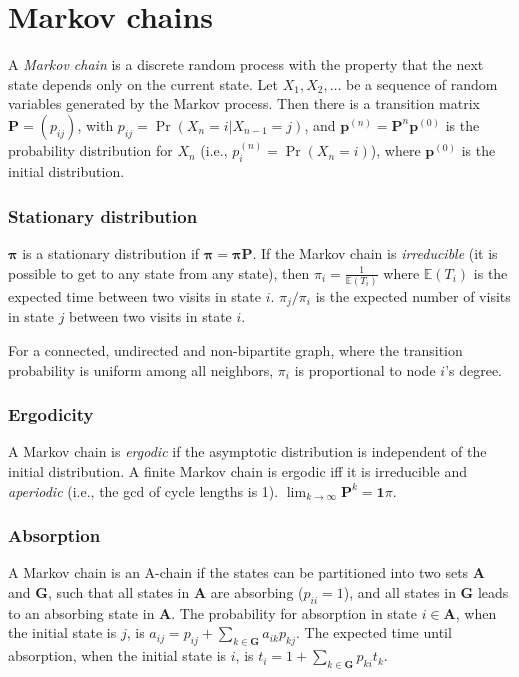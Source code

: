 \section{Markov chains}
A \emph{Markov chain} is a discrete random process with the property that the
next state depends only on the current state. Let $X_1,X_2,\ldots$ be a
sequence of random variables generated by the Markov process. Then there is a
transition matrix $\mathbf{P} = (p_{ij})$, with $p_{ij} = \Pr(X_n = i | X_{n-1}
     = j)$, and $\mathbf{p}^{(n)} = \mathbf P^n \mathbf p^{(0)}$ is the probability
distribution for $X_n$ (i.e., $p^{(n)}_i = \Pr(X_n = i)$), where
$\mathbf{p}^{(0)}$ is the initial distribution.

\subsubsection{Stationary distribution}
$\mathbf{\pi}$ is a stationary distribution if $\mathbf{\pi} = \mathbf{\pi P}$.
If the Markov chain is \emph{irreducible} (it is possible to get to any state from any state),
then $\pi_i = \frac{1}{\mathbb{E}(T_i)}$ where $\mathbb{E}(T_i)$  is the expected time between two visits in state $i$.
$\pi_j/\pi_i$ is the expected number of visits in state $j$ between two visits in state $i$.

For a connected, undirected and non-bipartite graph, where the transition
probability is uniform among all neighbors, $\pi_i$ is proportional to node
$i$'s degree.

\subsubsection{Ergodicity}
A Markov chain is \emph{ergodic} if the asymptotic distribution is independent
of the initial distribution. A finite Markov chain is ergodic iff it is
irreducible and \emph{aperiodic} (i.e., the gcd of cycle lengths is 1).
$\lim_{k\rightarrow\infty}\mathbf{P}^k = \mathbf{1}\pi$.

\subsubsection{Absorption}
A Markov chain is an A-chain if the states can be partitioned into two sets
$\mathbf{A}$ and $\mathbf{G}$, such that all states in $\mathbf{A}$ are
absorbing ($p_{ii}=1$), and all states in $\mathbf{G}$ leads to an absorbing
state in $\mathbf{A}$. The probability for absorption in state
$i\in\mathbf{A}$, when the initial state is $j$, is $a_{ij} =
     p_{ij}+\sum_{k\in\mathbf{G}} a_{ik}p_{kj}$. The expected time until absorption,
when the initial state is $i$, is $t_i = 1+\sum_{k\in\mathbf{G}}p_{ki}t_k$.

